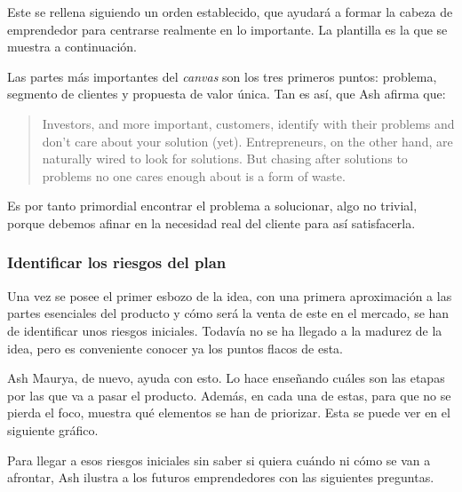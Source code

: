 Este se rellena siguiendo un orden establecido, que ayudará a formar la cabeza de emprendedor para centrarse realmente en lo importante. La plantilla es la que se muestra a continuación.


Las partes más importantes del \textit{canvas} son los tres primeros puntos: problema, segmento de clientes y propuesta de valor única. Tan es así, que Ash afirma que:

\begin{quote}
	\small Investors, and more important, customers, identify with their problems and don't care about your solution (yet). Entrepreneurs, on the other hand, are naturally wired to look for solutions. But chasing after solutions to problems no one cares enough about is a form of waste.
	\begin{flushright}
	\end{flushright}
\end{quote}

Es por tanto primordial encontrar el problema a solucionar, algo no trivial, porque debemos afinar en la necesidad real del cliente para así satisfacerla.

\subsubsection{Identificar los riesgos del plan}

Una vez se posee el primer esbozo de la idea, con una primera aproximación a las partes esenciales del producto y cómo será la venta de este en el mercado, se han de identificar unos riesgos iniciales. Todavía no se ha llegado a la madurez de la idea, pero es conveniente conocer ya los puntos flacos de esta.

Ash Maurya, de nuevo, ayuda con esto. Lo hace enseñando cuáles son las etapas por las que va a pasar el producto. Además, en cada una de estas, para que no se pierda el foco, muestra qué elementos se han de priorizar. Esta se puede ver en el siguiente gráfico.


Para llegar a esos riesgos iniciales sin saber si quiera cuándo ni cómo se van a afrontar, Ash ilustra a los futuros emprendedores con las siguientes preguntas.

